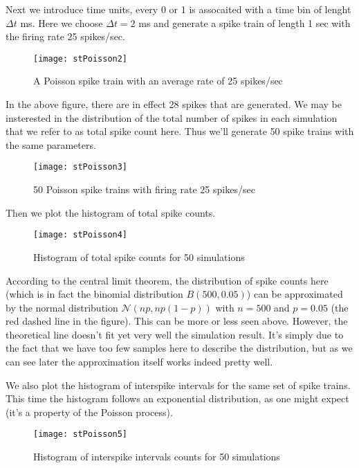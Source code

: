 Next we introduce time units, every 0 or 1 is assocaited with a time bin 
of lenght $\Delta t$ ms. Here we choose $\Delta t = 2$ ms and generate a spike
train of length 1 sec with the firing rate 25 spikes/sec.

\begin{figure}[H]
  \centering
  \texttt{[image: stPoisson2]}
  \caption{A Poisson spike train with an average rate of 25 spikes/sec}
\end{figure}

In the above figure, there are in effect 28 spikes that are generated. We may
be insterested in the distribution of the total number of spikes in each
simulation that we refer to as total spike count here. Thus we'll generate 50
spike trains with the same parameters.

\begin{figure}[H]
  \centering
  \texttt{[image: stPoisson3]}
  \caption{50 Poisson spike trains with firing rate 25 spikes/sec}
\end{figure}

\noindent
Then we plot the histogram of total spike counts.

\vspace*{-1em}
\begin{figure}[H]
  \centering
  \texttt{[image: stPoisson4]}
  \caption{Histogram of total spike counts for 50 simulations}
\end{figure}

According to the central limit theorem, the distribution of spike counts here
(which is in fact the binomial distribution $B(500,0.05)$) can be
approximated by the normal distribution $\mathcal{N}(np,np(1-p))$ with 
$n = 500$ and $p = 0.05$ (the red dashed line in the figure). This can be more
or less seen above. However, the theoretical line doesn't fit yet very
well the simulation result. It's simply due to the fact that we have too few 
samples here to describe the distribution, but as we can see later the 
approximation itself works indeed pretty well.

We also plot the histogram of interspike intervals for the same set of spike
trains. This time the histogram follows an exponential distribution, as one
might expect (it's a property of the Poisson process).\\

\vspace*{-1em}
\begin{figure}[H]
  \centering
  \texttt{[image: stPoisson5]}
  \caption{Histogram of interspike intervals counts for 50 simulations}
\end{figure}

